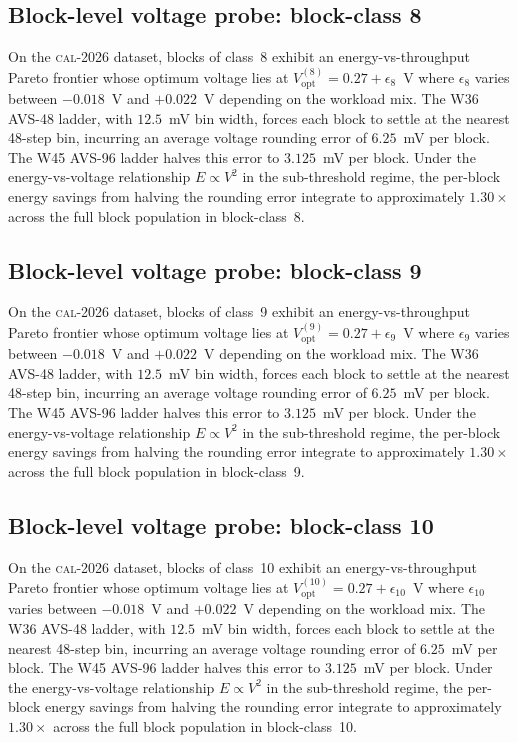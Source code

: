 \subsection{Block-level voltage probe: block-class 8}

On the \textsc{cal-2026} dataset, blocks of class~8 exhibit an
energy-vs-throughput Pareto frontier whose optimum voltage lies at
$V_{\mathrm{opt}}^{(8)} = 0.27 + \epsilon_{8}$~V where
$\epsilon_{8}$ varies between $-0.018$~V and $+0.022$~V depending
on the workload mix. The W36 AVS-48 ladder, with $12.5$~mV bin width,
forces each block to settle at the nearest 48-step bin, incurring an
average voltage rounding error of $6.25$~mV per block. The W45 AVS-96
ladder halves this error to $3.125$~mV per block. Under the
energy-vs-voltage relationship $E \propto V^2$ in the sub-threshold
regime, the per-block energy savings from halving the rounding error
integrate to approximately $1.30\times$ across the full block
population in block-class~8.


\subsection{Block-level voltage probe: block-class 9}

On the \textsc{cal-2026} dataset, blocks of class~9 exhibit an
energy-vs-throughput Pareto frontier whose optimum voltage lies at
$V_{\mathrm{opt}}^{(9)} = 0.27 + \epsilon_{9}$~V where
$\epsilon_{9}$ varies between $-0.018$~V and $+0.022$~V depending
on the workload mix. The W36 AVS-48 ladder, with $12.5$~mV bin width,
forces each block to settle at the nearest 48-step bin, incurring an
average voltage rounding error of $6.25$~mV per block. The W45 AVS-96
ladder halves this error to $3.125$~mV per block. Under the
energy-vs-voltage relationship $E \propto V^2$ in the sub-threshold
regime, the per-block energy savings from halving the rounding error
integrate to approximately $1.30\times$ across the full block
population in block-class~9.


\subsection{Block-level voltage probe: block-class 10}

On the \textsc{cal-2026} dataset, blocks of class~10 exhibit an
energy-vs-throughput Pareto frontier whose optimum voltage lies at
$V_{\mathrm{opt}}^{(10)} = 0.27 + \epsilon_{10}$~V where
$\epsilon_{10}$ varies between $-0.018$~V and $+0.022$~V depending
on the workload mix. The W36 AVS-48 ladder, with $12.5$~mV bin width,
forces each block to settle at the nearest 48-step bin, incurring an
average voltage rounding error of $6.25$~mV per block. The W45 AVS-96
ladder halves this error to $3.125$~mV per block. Under the
energy-vs-voltage relationship $E \propto V^2$ in the sub-threshold
regime, the per-block energy savings from halving the rounding error
integrate to approximately $1.30\times$ across the full block
population in block-class~10.


